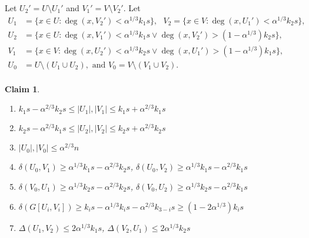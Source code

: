 \documentclass[oneside,12pt]{memoir}
\newtheorem{claim}[theorem]{Claim}
\begin{document}
Let $U_2'=U\setminus U_1'$ and $V_1'=V\setminus V_2'$.  Let
\begin{align*}
U_1&=\{x\in U: %
\deg(x,V_2')<\alpha^{1/3}k_1s\},~~~
V_2=\{x\in V: %
\deg(x,U_1')<\alpha^{1/3}k_2s\},\\
U_2&=\{x\in U: \deg(x, V_1')<\alpha^{1/3}k_1s \vee \deg(x,V_2')>(1-\alpha^{1/3})k_2s\},\\
V_1&=\{x\in V: \deg(x,U_2')<\alpha^{1/3}k_2s \vee \deg(x, U_1')>(1-\alpha^{1/3})k_1s\},\\
U_0&=U\setminus (U_1\cup U_2), \text{ and } V_0=V\setminus (V_1\cup V_2).\\
\end{align*}

\begin{claim}\label{preprocess}
\begin{enumerate}
\item $k_1s-\alpha^{2/3}k_2s\leq|U_1|,|V_1|\leq k_1s+\alpha^{2/3}k_1s$

\item $k_2s-\alpha^{2/3}k_1s\leq|U_2|,|V_2|\leq k_2s+\alpha^{2/3}k_2s$

\item $|U_0|,|V_0|\leq \alpha^{2/3}n$

\item $\delta(U_0,V_1)\geq \alpha^{1/3}k_1s-\alpha^{2/3}k_2s$, $\delta(U_0,V_2)\geq \alpha^{1/3}k_1s-\alpha^{2/3}k_1s$

\item $\delta(V_0,U_1)\geq \alpha^{1/3}k_2s-\alpha^{2/3}k_2s$, $\delta(V_0,U_2)\geq \alpha^{1/3}k_2s-\alpha^{2/3}k_1s$

\item $\delta(G[U_i,V_i])\geq k_is-\alpha^{1/3}k_is-\alpha^{2/3}k_{3-i}s\geq (1-2\alpha^{1/3})k_is$

\item $\Delta(U_1,V_2)\leq 2\alpha^{1/3}k_1s$, $\Delta(V_2,U_1)\leq 2\alpha^{1/3}k_2s$
\end{enumerate}

\end{claim}
\end{document}

